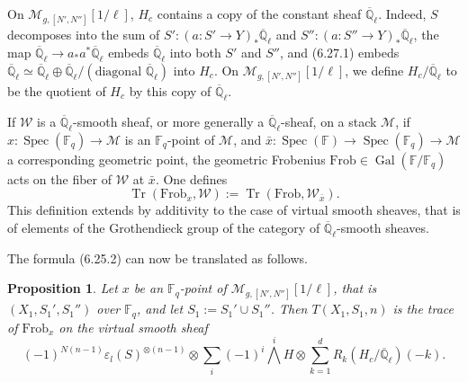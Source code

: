 \documentclass[11pt,a4paper]{article}
\theoremstyle{plain}
\newtheorem{proposition}[theorem]{Proposition}
\theoremstyle{definition}
\DeclareMathOperator{\Spec}{Spec}
\DeclareMathOperator{\Gal}{Gal}
\DeclareMathOperator{\Tr}{Tr}
\newcommand{\Ql}{\overline{\mathbb{Q}}_\ell}
\newcommand{\Fq}{\mathbb{F}_q}
\newcommand{\F}{\mathbb{F}}
\newcommand{\Frob}{\mathrm{Frob}}
\begin{document}
On $\mathcal{M}_{g,[N',N'']}[1/\ell]$, $H_c$ contains a copy of the constant sheaf $\Ql$. Indeed, $S$ decomposes into the sum of $S': (a: S' \to Y)_* \Ql$ and $S'': (a: S'' \to Y)_* \Ql$, the map $\Ql \to a_* a^* \Ql$ embeds $\Ql$ into both $S'$ and $S''$, and (6.27.1) embeds $\Ql \simeq \Ql \oplus \Ql /(\text{diagonal } \Ql)$ into $H_c$. On $\mathcal{M}_{g,[N',N'']}[1/\ell]$, we define $H_c/\Ql$ to be the quotient of $H_c$ by this copy of $\Ql$.

If $\mathcal{W}$ is a $\Ql$-smooth sheaf, or more generally a $\Ql$-sheaf, on a stack $\mathcal{M}$, if $x: \Spec(\Fq) \to \mathcal{M}$ is an $\Fq$-point of $\mathcal{M}$, and $\bar{x}: \Spec(\F) \to \Spec(\Fq) \to \mathcal{M}$ a corresponding geometric point, the geometric Frobenius $\Frob \in \Gal(\F/\Fq)$ acts on the fiber of $\mathcal{W}$ at $\bar{x}$. One defines
\[
\Tr(\Frob_x, \mathcal{W}) := \Tr(\Frob, \mathcal{W}_{\bar{x}}).
\]
This definition extends by additivity to the case of virtual smooth sheaves, that is of elements of the Grothendieck group of the category of $\Ql$-smooth sheaves.

The formula (6.25.2) can now be translated as follows.

\begin{proposition}
Let $x$ be an $\Fq$-point of $\mathcal{M}_{g,[N',N'']}[1/\ell]$, that is $(X_1, S_1', S_1'')$ over $\Fq$, and let $S_1 := S_1' \cup S_1''$. Then $T(X_1, S_1, n)$ is the trace of $\Frob_x$ on the virtual smooth sheaf
\begin{equation}
(-1)^{N(n-1)} \varepsilon_l(S)^{\otimes (n-1)} \otimes \sum_i (-1)^i \bigwedge^i H \otimes \sum_{k=1}^d R_k(H_c/\Ql)(-k). \tag{6.28.1}
\end{equation}
\end{proposition}
\end{document}
